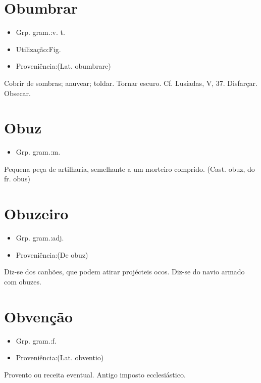 \section{Obumbrar}
\begin{itemize}
\item {Grp. gram.:v. t.}
\end{itemize}
\begin{itemize}
\item {Utilização:Fig.}
\end{itemize}
\begin{itemize}
\item {Proveniência:(Lat. \textunderscore obumbrare\textunderscore )}
\end{itemize}
Cobrir de sombras; anuvear; toldar.
Tornar escuro. Cf. \textunderscore Lusíadas\textunderscore , V, 37.
Disfarçar.
Obsecar.
\section{Obuz}
\begin{itemize}
\item {Grp. gram.:m.}
\end{itemize}
Pequena peça de artilharia, semelhante a um morteiro comprido.
(Cast. \textunderscore obuz\textunderscore , do fr. \textunderscore obus\textunderscore )
\section{Obuzeiro}
\begin{itemize}
\item {Grp. gram.:adj.}
\end{itemize}
\begin{itemize}
\item {Proveniência:(De \textunderscore obuz\textunderscore )}
\end{itemize}
Diz-se dos canhões, que podem atirar projécteis ocos.
Diz-se do navio armado com obuzes.
\section{Obvenção}
\begin{itemize}
\item {Grp. gram.:f.}
\end{itemize}
\begin{itemize}
\item {Proveniência:(Lat. \textunderscore obventio\textunderscore )}
\end{itemize}
Provento ou receita eventual.
Antigo imposto ecclesiástico.
